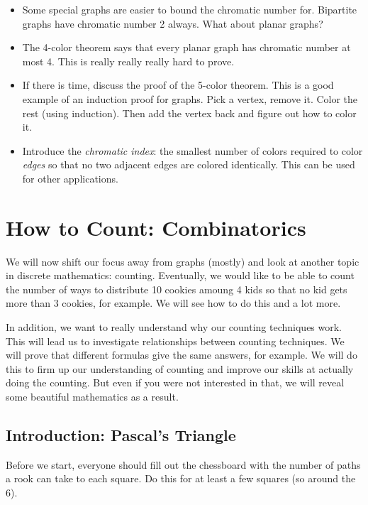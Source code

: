 \documentclass[12pt]{article}
\theoremstyle{plain}
\theoremstyle{definition}
\theoremstyle{remark}
\newcommand{\todayis}[1]{\clearpage{\rhead{\footnotesize #1}}}
\begin{document}
\begin{itemize}
     \item Some special graphs are easier to bound the chromatic number for.  Bipartite graphs have chromatic number 2 always.  What about planar graphs?

     \item The 4-color theorem says that every planar graph has chromatic number at most 4.  This is really really really hard to prove.

     \item If there is time, discuss the proof of the 5-color theorem.  This is a good example of an induction proof for graphs.  Pick a vertex, remove it.  Color the rest (using induction).  Then add the vertex back and figure out how to color it.

        \item Introduce the \emph{chromatic index}: the smallest number of colors required to color \emph{edges} so that no two adjacent edges are colored identically.  This can be used for other applications.
   \end{itemize}



   \todayis{Monday, October 1}

   \section*{How to Count: Combinatorics}

   We will now shift our focus away from graphs (mostly) and look at another topic in discrete mathematics: counting.  Eventually, we would like to be able to count the number of ways to distribute 10 cookies amoung 4 kids so that no kid gets more than 3 cookies, for example.  We will see how to do this and a lot more.

   In addition, we want to really understand why our counting techniques work.  This will lead us to investigate relationships between counting techniques.  We will prove that different formulas give the same answers, for example.  We will do this to firm up our understanding of counting and improve our skills at actually doing the counting.  But even if you were not interested in that, we will reveal some beautiful mathematics as a result.

   \subsection*{Introduction: Pascal's Triangle}

   Before we start, everyone should fill out the chessboard with the number of paths a rook can take to each square.  Do this for at least a few squares (so around the 6).
\end{document}
